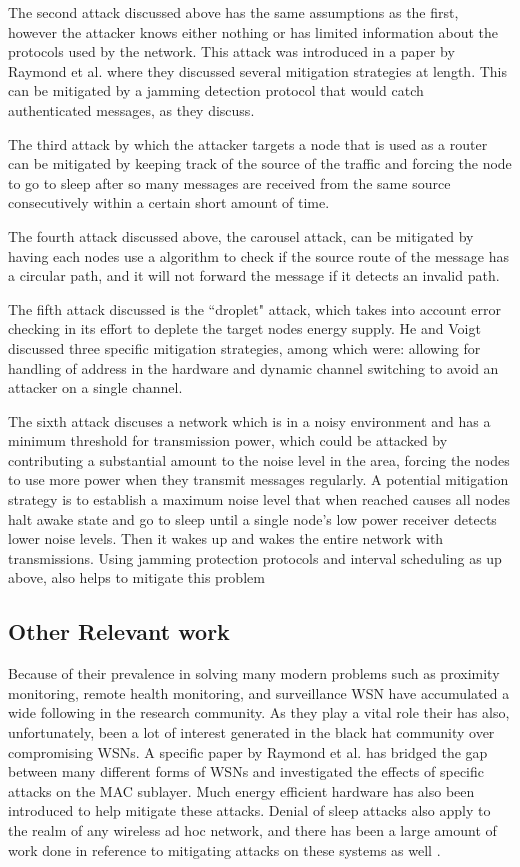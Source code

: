 The second attack discussed above has the same assumptions as the first, however the attacker knows either nothing or has limited information about the protocols used by the network. This attack was introduced in a paper by
Raymond et al. where they discussed several mitigation strategies at length\cite{4476299}. This can be mitigated by a jamming detection protocol that would catch authenticated messages, as they discuss. 

The third attack by which the attacker targets a node that is used as a router can be mitigated by keeping track of the source of the traffic and forcing the node to go to sleep after so many messages are received from the same
source consecutively within a certain short amount of time.

The fourth attack discussed above, the carousel attack, can be mitigated by having each nodes use a algorithm to check if the source route of the message has a circular path, and it will not forward the message if it detects an invalid path\cite{6112758}.  

The fifth attack discussed is the ``droplet" attack, which takes into account error checking in its effort to deplete the target nodes energy supply. He and Voigt discussed three specific mitigation strategies, among which were:
 allowing for handling of address in the hardware and dynamic channel switching to avoid an attacker on a single channel.

The sixth attack discuses a network which is in a noisy environment and has a minimum threshold for transmission power, which could be attacked by contributing a substantial amount to the noise level in the area, forcing the nodes
to use more power when they transmit messages regularly. A potential mitigation strategy is to establish a maximum noise level that when reached causes all nodes halt awake state and go to sleep until a single node's low power receiver detects lower noise levels.
Then it wakes up and wakes the entire network with transmissions. Using jamming protection protocols and interval scheduling as up above, also helps to mitigate this problem\cite{4476299}
 
\subsection{Other Relevant work}

Because of their prevalence in solving many modern problems such as proximity monitoring, remote health monitoring\cite{4561146}, and surveillance WSN have accumulated a wide following in the research community. As they play a vital role their has also, unfortunately, been a lot of interest generated in the black hat community over compromising WSNs. A specific paper by Raymond et al. has bridged the gap between many different forms of WSNs and investigated the effects of specific attacks on the MAC sublayer\cite{4476299}. Much energy efficient hardware has also been introduced to help mitigate these attacks\cite{6558065}. Denial of sleep attacks also apply to the realm of any wireless ad hoc network, and there has been a large amount of work done in reference to mitigating attacks on these systems as well \cite{6112758}.

